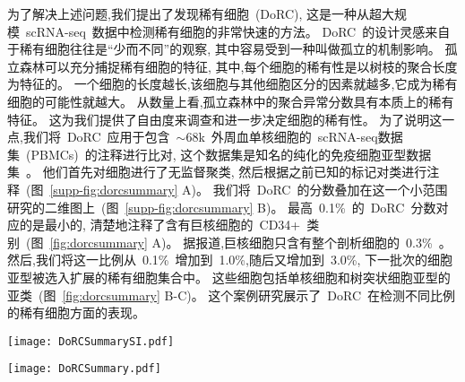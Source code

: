 为了解决上述问题,我们提出了发现稀有细胞~(DoRC),
这是一种从超大规模~scRNA-seq~数据中检测稀有细胞的非常快速的方法。
DoRC~的设计灵感来自于稀有细胞往往是``少而不同”的观察, 其中容易受到一种叫做孤立的机制影响。
孤立森林可以充分捕捉稀有细胞的特征,
其中,每个细胞的稀有性是以树枝的聚合长度为特征的。
一个细胞的长度越长,该细胞与其他细胞区分的因素就越多,它成为稀有细胞的可能性就越大。
从数量上看,孤立森林中的聚合异常分数具有本质上的稀有特征。
这为我们提供了自由度来调查和进一步决定细胞的稀有性。
为了说明这一点,我们将~DoRC~应用于包含~${\sim}68$k~外周血单核细胞的~scRNA-seq数据集~(PBMCs)~的注释进行比对,
这个数据集是知名的纯化的免疫细胞亚型数据集~\cite{zheng2017massively}。
他们首先对细胞进行了无监督聚类,
然后根据之前已知的标记对类进行注释~(图~\ref{supp-fig:dorcsummary} A)。
我们将~DoRC~的分数叠加在这一个小范围研究的二维图上~(图~\ref{supp-fig:dorcsummary} B)。
最高~0.1\%~的~DoRC~分数对应的是最小的, 
清楚地注释了含有巨核细胞的~CD34+~类别~(图~\ref{fig:dorcsummary} A)。
据报道,巨核细胞只含有整个剖析细胞的~0.3\%~\cite{zheng2017massively}。
然后,我们将这一比例从~0.1\%~增加到~1.0\%,随后又增加到~3.0\%,
下一批次的细胞亚型被选入扩展的稀有细胞集合中。
这些细胞包括单核细胞和树突状细胞亚型的亚类~(图~\ref{fig:dorcsummary} B-C)。
这个案例研究展示了~DoRC~在检测不同比例的稀有细胞方面的表现。

\begin{figure*}[!htbp]
    \centering
    \texttt{[image: DoRCSummarySI.pdf]}
    \caption{Performance evaluation of DoRC on PBMCs\_68k. 
    (A) t-SNE based 2D embedding of the data with color-marked cluster identities as reported by Zheng et al.~\cite{zheng2017massively}. 
    (B) Heat map of DoRC scores for the cells on PBMCs\_68k. 
    The cluster of megakaryocytes (0.3\%), the rarest of all the cell types are assigned the
    highest DoRC scores.
    (C) Rare cells identified by DoRC using IQR-thresholding-criteria}
    \label{supp-fig:dorcsummary}
\end{figure*}

\begin{figure*}[!htbp]
    \centering
    \texttt{[image: DoRCSummary.pdf]}
    \caption{DoRC discovers cells with varying degrees of rarity. In the ${\sim}68$k PBMC data~\cite{zheng2017massively}, minor cell populations with different grades of rarity show up with an
    increase in the number of selected rare cells. (A-C) The top 0.1, 1.0 and 3.0\% cells, respectively, selected on the basis of DoRC scores are highlighted}
    \label{fig:dorcsummary}
\end{figure*}

